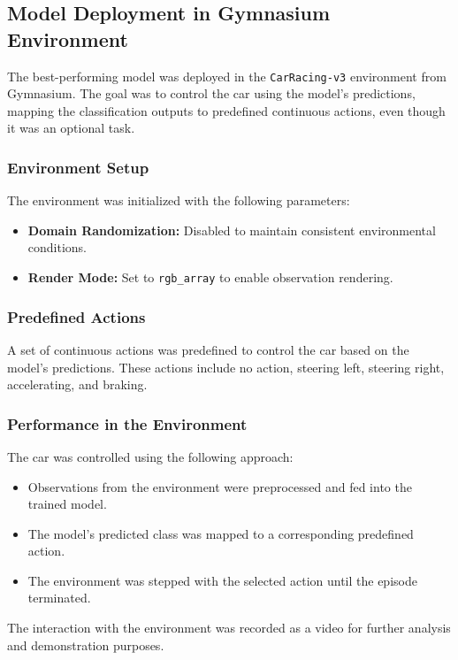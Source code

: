 \documentclass{article}
\begin{document}
\subsection{Model Deployment in Gymnasium Environment}

The best-performing model was deployed in the \texttt{CarRacing-v3} environment from Gymnasium. The goal was to control the car using the model's predictions, mapping the classification outputs to predefined continuous actions, even though it was an optional task.

\subsubsection{Environment Setup}

The environment was initialized with the following parameters:
\begin{itemize}
    \item \textbf{Domain Randomization:} Disabled to maintain consistent environmental conditions.
    \item \textbf{Render Mode:} Set to \texttt{rgb\_array} to enable observation rendering.
\end{itemize}

\subsubsection{Predefined Actions}
A set of continuous actions was predefined to control the car based on the model's predictions. These actions include no action, steering left, steering right, accelerating, and braking.

\subsubsection{Performance in the Environment}

The car was controlled using the following approach:
\begin{itemize}
    \item Observations from the environment were preprocessed and fed into the trained model.
    \item The model's predicted class was mapped to a corresponding predefined action.
    \item The environment was stepped with the selected action until the episode terminated.
\end{itemize}

\noindent
The interaction with the environment was recorded as a video for further analysis and demonstration purposes.
\end{document}
